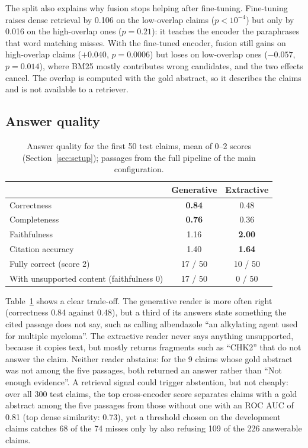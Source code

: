 \documentclass[runningheads]{llncs}
\begin{document}
The split also explains why fusion stops helping after fine-tuning. Fine-tuning
raises dense retrieval by 0.106 on the low-overlap claims ($p<10^{-4}$) but only by
0.016 on the high-overlap ones ($p=0.21$): it teaches the encoder the paraphrases
that word matching misses. With the fine-tuned encoder, fusion still gains on
high-overlap claims ($+0.040$, $p=0.0006$) but loses on low-overlap ones
($-0.057$, $p=0.014$), where BM25 mostly contributes wrong candidates, and the two
effects cancel. The overlap is computed with the gold abstract, so it describes
the claims and is not available to a retriever.

\subsection{Answer quality}

\begin{table}[t]
\centering\footnotesize
\caption{Answer quality for the first 50 test claims, mean of 0--2 scores
(Section~\ref{sec:setup}); passages from the full pipeline of the main
configuration.}
\label{tab:answers}
\begin{tabular}{@{}lcc@{}}
\toprule
 & Generative & Extractive \\
\midrule
Correctness          & \textbf{0.84} & 0.48 \\
Completeness         & \textbf{0.76} & 0.36 \\
Faithfulness         & 1.16 & \textbf{2.00} \\
Citation accuracy    & 1.40 & \textbf{1.64} \\
\midrule
Fully correct (score 2)          & 17 / 50 & 10 / 50 \\
With unsupported content (faithfulness 0) & 17 / 50 & 0 / 50 \\
\bottomrule
\end{tabular}
\end{table}

Table~\ref{tab:answers} shows a clear trade-off. The generative reader is more
often right (correctness 0.84 against 0.48), but a third of its answers state
something the cited passage does not say, such as calling albendazole ``an
alkylating agent used for multiple myeloma''. The extractive reader never says
anything unsupported, because it copies text, but mostly returns fragments such as
``CHK2'' that do not answer the claim. Neither reader
abstains: for the 9 claims whose gold abstract was not among the five passages,
both returned an answer rather than ``Not enough evidence''. A retrieval signal
could trigger abstention, but not cheaply: over all 300 test claims, the top
cross-encoder score separates claims with a gold abstract among the five
passages from those without one with an ROC AUC of 0.81 (top dense similarity:
0.73), yet a threshold chosen on the development claims catches 68 of the 74
misses only by also refusing 109 of the 226 answerable claims.
\end{document}
